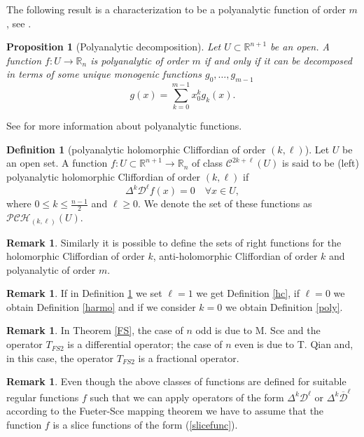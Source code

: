 \documentclass[reqno,11pt]{amsart}
\numberwithin{equation}{section}
\newtheorem{proposition}[theorem]{Proposition}
\theoremstyle{definition}
\newtheorem{remark}[theorem]{{\bf Remark}}
\newtheorem{definition}[theorem]{Definition}
\begin{document}
The following result is a characterization to be a polyanalytic function of order $m$, see \cite{B1976}.
\begin{proposition}[Polyanalytic decomposition]
	\label{polydeco}
	Let $ U \subset \mathbb{R}^{n+1}$ be an open. A function $f:U \to \mathbb{R}_n$ is polyanalytic of order $m$ if and only if it can be decomposed in terms of some unique monogenic functions $g_0,\ldots, g_{m-1}$
	$$ g(x)= \sum_{k=0}^{m-1} x_0^k g_k(x).$$
\end{proposition}
See \cite{B1976, DB1978, T} for more information about polyanalytic functions.
\begin{definition}[polyanalytic holomorphic Cliffordian of order $(k, \ell)$]
	\label{polycl}
	Let $U$ be an open set. A function $f:U \subset \mathbb{R}^{n+1} \to \mathbb{R}_n$ of class $\mathcal{C}^{2k+ \ell}(U)$ is said to be (left) polyanalytic holomorphic Cliffordian of order $(k, \ell)$ if
	$$ \Delta^k \mathcal{D}^{\ell}  f(x)=0\quad \forall x\in U,$$
	where $0 \leq k \leq \frac{n-1}{2}$ and $ \ell \geq 0$. We denote the set of these functions as $\mathcal{PCH}_{(k,\ell)}(U)$.
\end{definition}
\begin{remark}
Similarly it is possible to define the  sets of right functions for the holomorphic Cliffordian of order $k$, anti-holomorphic Cliffordian of order $k$ and polyanalytic of order $m$.

\end{remark}
\begin{remark}
	If in Definition \ref{polycl} we set $ \ell=1$ we get Definition \ref{hc}, if $\ell=0$ we obtain Definition \ref{harmo} and if we consider $k=0$ we obtain Definition \ref{poly}.
\end{remark}

\begin{remark}
	In Theorem \ref{FS}, the case of $n$ odd is due to M. Sce and the operator $T_{FS2}$ is a differential operator; the case of $n$ even is due to T. Qian and, in this case, the operator $T_{FS2}$ is a fractional operator.
\end{remark}
\begin{remark}
Even though the above classes of functions are defined
for suitable regular functions $f$ such that we can apply operators of the form
$\Delta^k \mathcal{D}^{\ell}$ or $\Delta^k \overline{\mathcal{D}}^{\ell}$ according to the Fueter-Sce mapping theorem
we have to assume that the function $f$ is a slice functions
 of the form (\ref{slicefunc}).
\end{remark}
\end{document}
